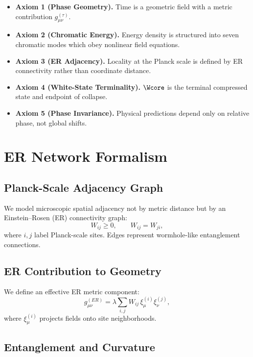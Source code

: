 \begin{itemize}
  \item \textbf{Axiom 1 (Phase Geometry).} Time is a geometric field with a metric contribution $g^{(\tau)}_{\mu\nu}$.
  \item \textbf{Axiom 2 (Chromatic Energy).} Energy density is structured into seven chromatic modes which obey nonlinear field equations.
  \item \textbf{Axiom 3 (ER Adjacency).} Locality at the Planck scale is defined by ER connectivity rather than coordinate distance.
  \item \textbf{Axiom 4 (White-State Terminality).} $\Wcore$ is the terminal compressed state and endpoint of collapse.
  \item \textbf{Axiom 5 (Phase Invariance).} Physical predictions depend only on relative phase, not global shifts.
\end{itemize}


\chapter{ER Network Formalism}

\section{Planck-Scale Adjacency Graph}

We model microscopic spatial adjacency not by metric distance but by 
an Einstein--Rosen (ER) connectivity graph:
\[
W_{ij} \ge 0,\qquad W_{ij}=W_{ji},
\]
where $i,j$ label Planck-scale sites.  
Edges represent wormhole-like entanglement connections.

\section{ER Contribution to Geometry}

We define an effective ER metric component:
\[
g^{(ER)}_{\mu\nu} = \lambda 
\sum_{i,j} W_{ij}\, \xi^{(i)}_\mu \xi^{(j)}_\nu,
\]
where $\xi^{(i)}_\mu$ projects fields onto site neighborhoods.

\section{Entanglement and Curvature}

